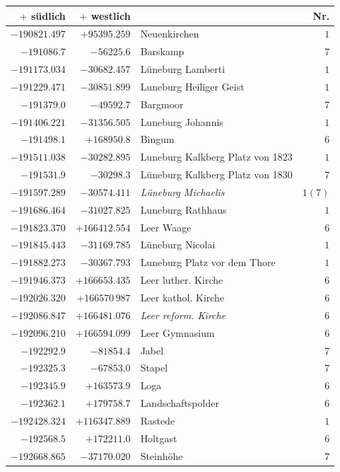 \clearpage
\begin{center}\begingroup\fontsize{8}{9}\selectfont
\setlength{\tabcolsep}{4pt}
\begin{tabular}{r|r|p{170pt}|r}\hline
\(+\) südlich&\(+\) westlich&&Nr.\\\hline
\(-190821.497\)&\(+95395.259\)&Neuenkirchen&\(1\)\\
\(-191086.7\)&\(-56225.6\)&Barskamp&\(7\)\\
\(-191173.034\)&\(-30682.457\)&Lüneburg Lamberti&\(1\)\\
\(-191229.471\)&\(-30851.899\)&Luneburg Heiliger Geist&\(1\)\\
\(-191379.0\)&\(-49592.7\)&Bargmoor&\(7\)\\
\(-191406.221\)&\(-31356.505\)&Luneburg Johannis&\(1\)\\
\(-191498.1\)&\(+168950.8\)&Bingum&\(6\)\\
\(-191511.038\)&\(-30282.895\)&Luneburg Kalkberg Platz von 1823&\(1\)\\
\(-191531.9\)&\(-30298.3\)&Lüneburg Kalkberg Platz von 1830&\(7\)\\
\(-191597.289\)&\(-30574.411\)&\textit{Lüneburg Michaelis}&\(1 (7)\)\\
\(-191686.464\)&\(-31027.825\)&Luneburg Rathhaus&\(1\)\\
\(-191823.370\)&\(+166412.554\)&Leer Waage&\(6\)\\
\(-191845.443\)&\(-31169.785\)&Lüneburg Nicolai&\(1\)\\
\(-191882.273\)&\(-30367.793\)&Luneburg Platz vor dem Thore&\(1\)\\
\(-191946.373\)&\(+166653.435\)&Leer luther. Kirche&\(6\)\\
\(-192026.320\)&\(+166570\,987\)&Leer kathol. Kirche&\(6\)\\
\(-192086.847\)&\(+166481.076\)&\textit{Leer reform. Kirche}&\(6\)\\
\(-192096.210\)&\(+166594.099\)&Leer Gymnasium&\(6\)\\
\(-192292.9\)&\(-81854.4\)&Jabel&\(7\)\\
\(-192325.3\)&\(-67853.0\)&Stapel&\(7\)\\
\(-192345.9\)&\(+163573.9\)&Loga&\(6\)\\
\(-192362.1\)&\(+179758.7\)&Landschaftspolder&\(6\)\\
\(-192428.324\)&\(+116347.889\)&Rastede&\(1\)\\
\(-192568.5\)&\(+172211.0\)&Holtgast&\(6\)\\
\(-192668.865\)&\(-37170.020\)&Steinhöhe&\(7\)\\

\end{tabular}
\end{center}
